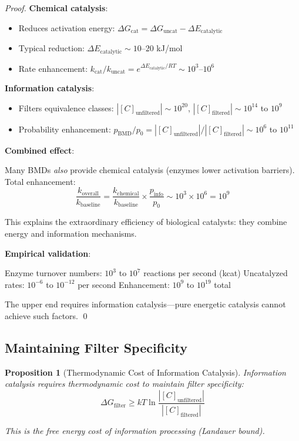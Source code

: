 \documentclass[12pt,a4paper]{article}
\newtheorem{proposition}{Proposition}
\begin{document}
\begin{proof}
\textbf{Chemical catalysis}:
\begin{itemize}
\item Reduces activation energy: $\Delta G_{\text{cat}} = \Delta G_{\text{uncat}} - \Delta E_{\text{catalytic}}$
\item Typical reduction: $\Delta E_{\text{catalytic}} \sim 10$--$20$ kJ/mol
\item Rate enhancement: $k_{\text{cat}}/k_{\text{uncat}} = e^{\Delta E_{\text{catalytic}}/RT} \sim 10^3$--$10^6$
\end{itemize}

\textbf{Information catalysis}:
\begin{itemize}
\item Filters equivalence classes: $|[C]_{\text{unfiltered}}| \sim 10^{20}$, $|[C]_{\text{filtered}}| \sim 10^{14}$ to $10^9$
\item Probability enhancement: $p_{\text{BMD}}/p_0 = |[C]_{\text{unfiltered}}|/|[C]_{\text{filtered}}| \sim 10^6$ to $10^{11}$
\end{itemize}

\textbf{Combined effect}:

Many BMDs \textit{also} provide chemical catalysis (enzymes lower activation barriers). Total enhancement:
\begin{equation}
\frac{k_{\text{overall}}}{k_{\text{baseline}}} = \frac{k_{\text{chemical}}}{k_{\text{baseline}}} \times \frac{p_{\text{info}}}{p_0} \sim 10^3 \times 10^6 = 10^9
\end{equation}

This explains the extraordinary efficiency of biological catalysts: they combine energy and information mechanisms.

\textbf{Empirical validation}:

Enzyme turnover numbers: $10^3$ to $10^7$ reactions per second (kcat)
Uncatalyzed rates: $10^{-6}$ to $10^{-12}$ per second
Enhancement: $10^9$ to $10^{19}$ total

The upper end requires information catalysis—pure energetic catalysis cannot achieve such factors. \qed
\end{proof}

\subsection{Maintaining Filter Specificity}

\begin{proposition}[Thermodynamic Cost of Information Catalysis]
\label{prop:bmd_thermodynamic_cost}
Information catalysis requires thermodynamic cost to maintain filter specificity:
\begin{equation}
\Delta G_{\text{filter}} \geq kT \ln \frac{|[C]_{\text{unfiltered}}|}{|[C]_{\text{filtered}}|}
\end{equation}

This is the free energy cost of information processing (Landauer bound).
\end{proposition}
\end{document}
